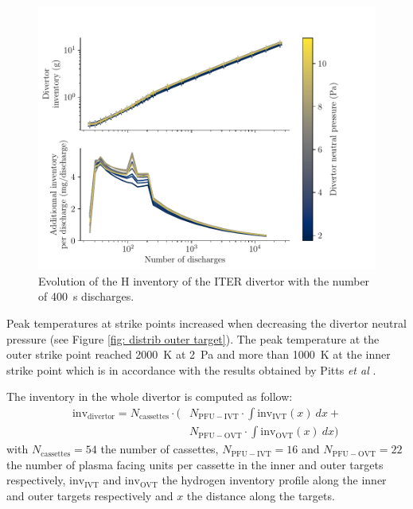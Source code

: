 \begin{figure}[h!]
    \centering
    \includegraphics[width=\linewidth]{Figures/divertor/ITER/inventory_vs_time.pdf}
    \caption{Evolution of the H inventory of the ITER divertor with the number of \SI{400}{s} discharges.}
    \label{fig: iter vs time}
\end{figure}


Peak temperatures at strike points increased when decreasing the divertor neutral pressure (see Figure \ref{fig: distrib outer target}).
The peak temperature at the outer strike point reached \SI{2000}{K} at \SI{2}{Pa} and more than \SI{1000}{K} at the inner strike point which is in accordance with the results obtained by Pitts \textit{et al} \cite{pitts_physics_2019}.

The inventory in the whole divertor is computed as follow:
\begin{equation}
\begin{split}
    \mathrm{inv_{divertor}} = N_\mathrm{cassettes} \cdot \big(&N_\mathrm{PFU-IVT} \cdot \int \mathrm{inv_{IVT}}(x)\: dx + \\ &N_\mathrm{PFU-OVT} \cdot\int \mathrm{inv_{OVT}}(x) \: dx \big)
\end{split}
\end{equation}
with $N_\mathrm{cassettes}=54$ the number of cassettes, $N_\mathrm{PFU-IVT}=16$ and $N_\mathrm{PFU-OVT}=22$ the number of plasma facing units per cassette in the inner and outer targets respectively, $\mathrm{inv_{IVT}}$ and $\mathrm{inv_{OVT}}$ the hydrogen inventory profile along the inner and outer targets respectively and $x$ the distance along the targets.

